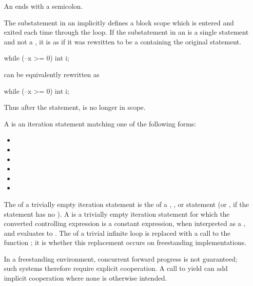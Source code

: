 \begin{note}
An  ends with a semicolon.
\end{note}

\pnum
{}%
The substatement in an  implicitly defines
a block scope which is entered and exited each time
through the loop.
If the substatement in an  is
a single statement and not a ,
it is as if it was rewritten to be
a  containing the original statement.
\begin{example}
\begin{codeblock}
while (--x >= 0)
  int i;
\end{codeblock}
can be equivalently rewritten as
\begin{codeblock}
while (--x >= 0) {
  int i;
}
\end{codeblock}
Thus after the  statement,  is no longer in scope.
\end{example}

\pnum
A  is
an iteration statement matching one of the following forms:
\begin{itemize}
\item {}  \tcode{) ;}
\item {}  \tcode{) \{ \}}
\item {}  \tcode{) ;}
\item {}  \tcode{) ;}
\item {}   \tcode{; ) ;}
\item {}   \tcode{; ) \{ \}}
\end{itemize}
The  of a trivially empty iteration statement
is the  of
a , , or  statement
(or , if the  statement has no ).
A  is a trivially empty iteration statement
for which the converted controlling expression is a constant expression,
when interpreted as a , and
evaluates to .
The  of a trivial infinite loop is replaced with
a call to the function ;
it is 
whether this replacement occurs on freestanding implementations.
\begin{note}
In a freestanding environment,
concurrent forward progress is not guaranteed;
such systems therefore require explicit cooperation.
A call to yield can add implicit cooperation where none is otherwise intended.
\end{note}

